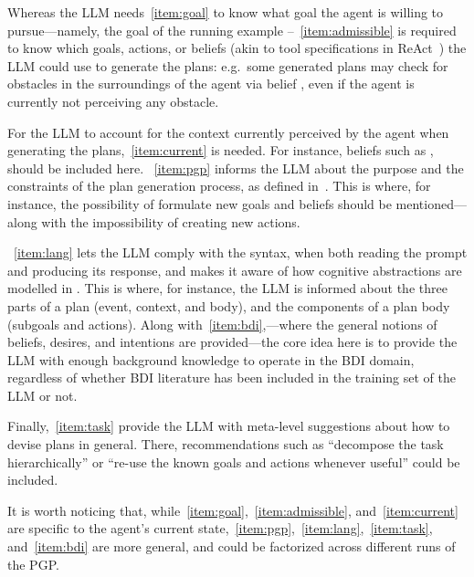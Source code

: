 \documentclass[12pt,a4paper,openright,twoside]{book}
\begin{document}
Whereas the \ac{LLM} needs~\ref{item:goal} to know what goal the agent is willing to pursue---namely, the goal  of the running example --~\ref{item:admissible} is required to know which goals, actions, or beliefs (akin to tool specifications in \ac{ReAct}~\cite{YaoZYDSN023}) the \ac{LLM} could use to generate the plans: e.g.\, some generated plans may check for obstacles in the surroundings of the agent via belief , even if the agent is currently not perceiving any obstacle.


For the \ac{LLM} to account for the context currently perceived by the agent when generating the plans,~\ref{item:current} is needed.
%
For instance, beliefs such as ,  should be included here.
%
~\ref{item:pgp} informs the \ac{LLM} about the purpose and the constraints of the plan generation process, as defined in~.
%
This is where, for instance, the possibility of formulate new goals and beliefs should be mentioned---along with the impossibility of creating new actions.

~\ref{item:lang} lets the \ac{LLM} comply with the \agentspeak{} syntax, when both reading the prompt and producing its response, and makes it aware of how cognitive abstractions are modelled in \agentspeak{}.
%
This is where, for instance, the \ac{LLM} is informed about the three parts of a plan (event, context, and body), and the components of a plan body (subgoals and actions).
%
Along with~\ref{item:bdi},---where the general notions of beliefs, desires, and intentions are provided---the core idea here is to provide the \ac{LLM} with enough background knowledge to operate in the \ac{BDI} domain, regardless of whether \ac{BDI} literature has been included in the training set of the \ac{LLM} or not.

Finally,~\ref{item:task} provide the \ac{LLM} with meta-level suggestions about how to devise plans in general.
%
There, recommendations such as ``decompose the task hierarchically'' or ``re-use the known goals and actions whenever useful'' could be included.

It is worth noticing that, while~\ref{item:goal},~\ref{item:admissible}, and~\ref{item:current} are specific to the agent's current state,~\ref{item:pgp},~\ref{item:lang},~\ref{item:task}, and~\ref{item:bdi} are more general, and could be factorized across different runs of the \ac{PGP}.
\end{document}

